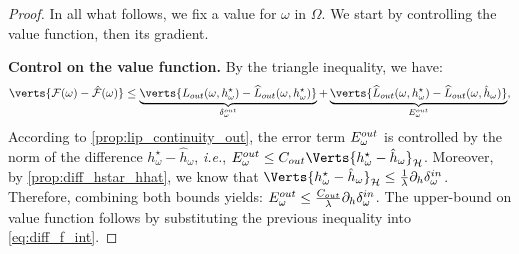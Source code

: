 \begin{proof}
In all what follows, we fix a value for $\omega$ in $\Omega$. We start by controlling the value function, then its gradient.

{\bf Control on the value function.}
By the triangle inequality, we have:
\begin{equation}\label{eq:diff_f_int}
    \verts{\mathcal{F}(\omega)-\hat{\mathcal{F}}(\omega)}\leq\underbrace{\verts{L_{out}(\omega, h^\star_\omega)-\widehat{L}_{out}(\omega, h^\star_\omega)}}_{\delta_{\omega}^{out}} +\underbrace{\verts{\widehat{L}_{out}(\omega, h^\star_\omega)-\widehat{L}_{out}(\omega, \hat{h}_\omega)}}_{\Eout},
\end{equation}
According to \cref{prop:lip_continuity_out}, the error term $E_\omega^{out}$ is controlled by the norm of the difference $h^\star_\omega-\hat{h}_\omega$, \textit{i.e.}, $\Eout\leq C_{out}\Verts{h^\star_\omega-\hat{h}_\omega}_\mathcal{H}$. 
Moreover, by \cref{prop:diff_hstar_hhat}, we know that $\Verts{h^\star_\omega-\hat{h}_\omega}_\mathcal{H}\leq \frac{1}{\lambda}\Dinh$. Therefore, combining both bounds yields: 
	$E_\omega^{out}\leq \frac{C_{out}}{\lambda}\partial_{h}\delta_\omega^{in}$. 
The upper-bound on value function follows by substituting the previous inequality into \cref{eq:diff_f_int}. 


\end{proof}
